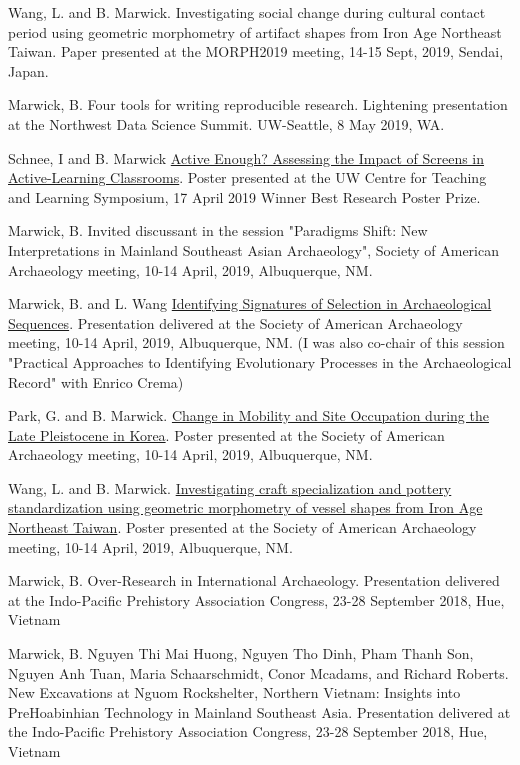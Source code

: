 \ind Wang, L. and B. Marwick. Investigating social change during cultural contact period using geometric morphometry of artifact shapes from Iron Age Northeast Taiwan. Paper presented at the MORPH2019 meeting, 14-15 Sept, 2019, Sendai, Japan.

\ind Marwick, B. Four tools for writing reproducible research. Lightening presentation at the Northwest Data Science Summit. UW-Seattle, 8 May 2019, WA. 

\ind Schnee, I and B. Marwick \href{https://www.washington.edu/teaching/files/2019/04/Schnee.Ian_.pdf}{Active Enough? Assessing the Impact of Screens in Active-Learning Classrooms}. Poster presented at the UW Centre for Teaching and Learning Symposium, 17 April 2019 Winner Best Research Poster Prize. 

\ind Marwick, B. Invited discussant in the session "Paradigms Shift: New Interpretations in Mainland Southeast Asian Archaeology", Society of American Archaeology meeting, 10-14 April, 2019, Albuquerque, NM.

\ind Marwick, B.  and L. Wang \href{https://github.com/benmarwick/signatselect}{Identifying Signatures of Selection in Archaeological Sequences}. Presentation delivered at the Society of American Archaeology meeting, 10-14 April, 2019, Albuquerque, NM.  (I was also co-chair of this session "Practical Approaches to Identifying Evolutionary Processes in the Archaeological Record" with Enrico Crema)

\ind Park, G. and B. Marwick. \href{https://doi.org/10.17605/OSF.IO/YAGD2}{Change in Mobility and Site Occupation during the Late Pleistocene in Korea}. Poster presented at the Society of American Archaeology meeting, 10-14 April, 2019, Albuquerque, NM. 

\ind Wang, L. and B. Marwick. \href{https://doi.org/10.17605/OSF.IO/J59DF}{Investigating craft specialization and pottery standardization using geometric morphometry of vessel shapes from Iron Age Northeast Taiwan}. Poster presented at the Society of American Archaeology meeting, 10-14 April, 2019, Albuquerque, NM. 

\ind Marwick, B. Over-Research in International Archaeology. Presentation delivered at the Indo-Pacific Prehistory Association Congress, 23-28 September 2018, Hue, Vietnam

\ind Marwick, B. Nguyen Thi Mai Huong, Nguyen Tho Dinh, Pham Thanh Son, Nguyen Anh
Tuan, Maria Schaarschmidt, Conor Mcadams, and Richard Roberts. New Excavations at Nguom Rockshelter, Northern Vietnam: Insights into PreHoabinhian Technology in Mainland Southeast Asia. Presentation delivered at the Indo-Pacific Prehistory Association Congress, 23-28 September 2018, Hue, Vietnam

